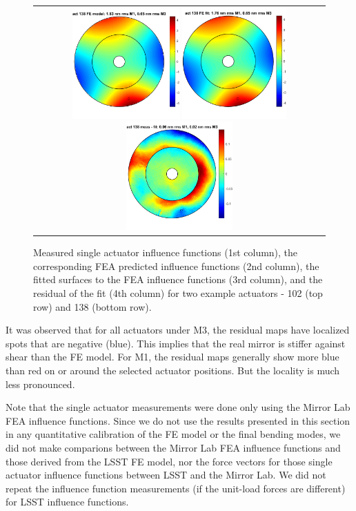 \documentclass [twoside,openbib,12pt]{article}
\begin{document}
\begin{figure}[bthp]
\begin{center}
\begin{tabular}{c}
       \includegraphics[width=41mm]{figures/if138f.png}
       \includegraphics[width=40mm]{figures/if138fit.png}
       \includegraphics[width=41mm]{figures/if138r.png} 
  \end{tabular}
   \end{center}
   \caption
   { \label{fig:IFeg}
     Measured single actuator influence functions (1st column), the
     corresponding FEA predicted influence functions (2nd column), the
     fitted surfaces to the FEA influence functions (3rd column), and
     the residual of the fit (4th column) for two example actuators -
     102 (top row) and 138 (bottom row).
 }
\end{figure}

It was observed that for all actuators under M3, the residual maps
have localized spots that are negative (blue). This implies that the real
mirror is stiffer against shear than the FE model.
For M1, the residual maps generally show more blue than red on or
around the selected actuator positions. But the locality is much less pronounced.

Note that the single actuator measurements were done only
using the Mirror Lab FEA influence functions.
Since we do not use the results presented in this section in any 
quantitative calibration of the FE model or the final bending modes,
we did not make comparions between the Mirror Lab FEA influence
functions and those derived from the LSST FE model, nor the force
vectors for those single actuator influence functions between LSST and
the Mirror Lab.
We did not repeat the influence function measurements (if the
unit-load forces
are different) for LSST influence functions.
\end{document}

